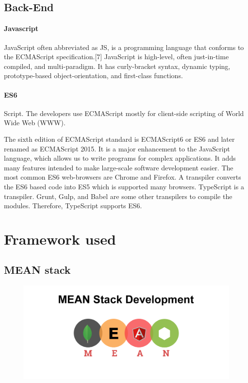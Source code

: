 \subsection{Back-End}
\paragraph{Javascript}
JavaScript often abbreviated as JS, is a programming language that conforms to the ECMAScript specification.[7] JavaScript is high-level, often just-in-time compiled, and multi-paradigm. It has curly-bracket syntax, dynamic typing, prototype-based object-orientation, and first-class functions.
\paragraph{ES6}
Script. The developers use ECMAScript mostly for client-side scripting of World Wide Web (WWW).

The sixth edition of ECMAScript standard is ECMAScript6 or ES6 and later renamed as ECMAScript 2015. It is a major enhancement to the JavaScript language, which allows us to write programs for complex applications. It adds many features intended to make large-scale software development easier. The most common ES6 web-browsers are Chrome and Firefox. A transpiler converts the ES6 based code into ES5 which is supported many browsers. TypeScript is a transpiler. Grunt, Gulp, and Babel are some other transpilers to compile the modules. Therefore, TypeScript supports ES6.

\section{Framework used}
\subsection*{MEAN stack}

\begin{figure}[!ht]
      \center
      \includegraphics[scale=0.30]{assets/meanstack.png}
\end{figure}

